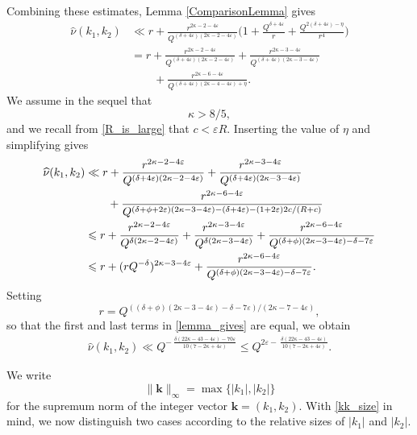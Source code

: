 \documentclass[12pt, reqno]{amsart}
\theoremstyle{definition}
\theoremstyle{remark}
\numberwithin{equation}{section}
\def\del{{\delta}} \def\Del{{\Delta}}
\def\kap{{\kappa}}
\def\eps{\varepsilon}
\def\le{\leqslant} \def\ge{\geqslant}
\def \bk {\mathbf k}
\begin{document}
Combining these estimates, Lemma \ref{ComparisonLemma} gives
\begin{align*}  \widehat{\nu}(k_1, k_2) &\ll 
r + \frac{r^{2\kappa-2-4\varepsilon}}{Q^{(\delta+4\varepsilon)(2\kappa-2 -4\varepsilon)}}\Big(1 + \frac{Q^{\delta + 4\varepsilon}}{r} + \frac{Q^{2(\delta+4\eps) - \eta}}{r^4} \Big) \\ 
& = r + \frac{r^{2\kappa-2-4\varepsilon}}{Q^{(\delta+4\varepsilon)(2\kappa-2 -4\varepsilon)}} + \frac{r^{2\kappa - 3 -4\varepsilon}}{Q^{(\delta+4\varepsilon)(2\kappa -3-4\varepsilon) }} \\
& \qquad + 
\frac{r^{2\kappa - 6 -4 \eps}}
{Q^{(\delta + 4 \eps)(2\kappa -4 - 4\eps)
	+\eta}}. 
\end{align*}
We assume in the sequel that 
\[
\kap > 8/5,
\]
and we recall from \eqref{R_is_large} that 
$c < \eps R$.
Inserting the value of $\eta$ and simplifying gives
\begin{align}
\notag
\widehat{\nu}(k_1,k_2) &\ll  
r + \frac{r^{2\kappa-2-4\varepsilon}}{Q^{(\delta+4\varepsilon)(2\kappa-2 -4\varepsilon)}} + \frac{r^{2\kappa - 3 -4\varepsilon}}{Q^{(\delta+4\varepsilon)(2\kappa -3-4\varepsilon)}} \\ \notag 
& \qquad + 
\frac{r^{2\kappa - 6 -4 \eps}}
{Q^{(\delta + \phi + 2 \eps)(2\kappa - 3 - 4\eps) - (\del + 4 \eps) - (1+2\eps)2c/(R+c)}} 
\\ \notag
&\le
r + \frac{r^{2\kappa-2-4\varepsilon}}
{Q^{\del(2\kap-2 -4\eps)}} + \frac{r^{2\kappa - 3 -4\varepsilon}}{Q^{\del(2\kap -3-4\eps)}} + 
\frac{r^{2\kappa - 6 -4 \eps}}
{Q^{(\delta + \phi)
	(2\kappa - 3 - 4\eps) - 
	\del - 7 \eps}} \\
&\le
r + (rQ^{-\del})^{2\kap-3-4\eps} + 
\frac{r^{2\kappa - 6 -4 \eps}}
{Q^{(\delta + \phi)
	(2\kappa - 3 - 4\eps) - 
	\del - 7 \eps}}
.\label{lemma_gives} 
\end{align}
Setting
\[  
r = Q^{((\delta + \phi)
(2\kappa - 3 - 4\eps) - 
\del - 7 \eps)/
(2 \kap - 7 - 4 \eps)},
\] 
so that the first and last terms in \eqref{lemma_gives} are equal, we obtain 
\begin{align}
\label{obtain}
\widehat{\nu}(k_1, k_2) \ll  
Q^{- \: \frac{\del(22\kap-43-4\eps)-70\eps}
{10(7 - 2 \kap + 4 \eps)}} 
\le Q^{2 \eps - \: \frac{\del(22\kap-43-4\eps)}
{10(7 - 2 \kap + 4 \eps)}}.
\end{align}

\bigskip

We write 
\[ 
\|\bk\|_{\infty} = 
\max\{  |k_1|, |k_2| \}  
\]
for the supremum norm of the integer vector 
$\bk = (k_1, k_2).$ 
With \eqref{kk_size} in mind, we now distinguish two cases according to the relative sizes of 
$|k_1|$ and $|k_2|.$
\end{document}
